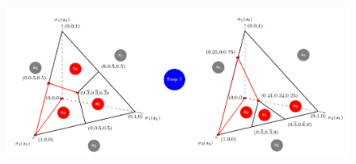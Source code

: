 \begin{figure}[H]
\centering
\includegraphics[width=\textwidth]{images/img_2_13_10.png}
\end{figure}